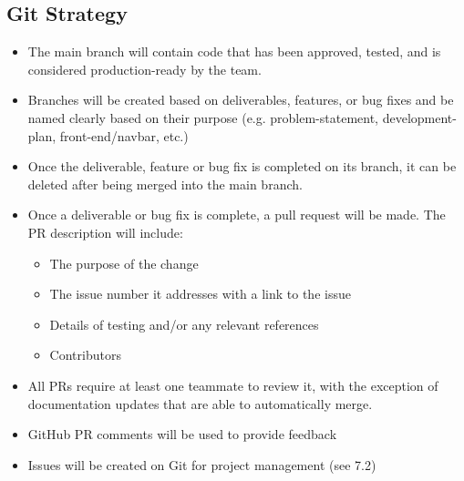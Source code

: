 \documentclass{article}
\begin{document}
\subsection{Git Strategy}
\begin{itemize}
	\item The main branch will contain code that has been approved, tested, and is considered production-ready by 
  the team.
	\item Branches will be created based on deliverables, features, or bug fixes and be named clearly based on their 
  purpose (e.g. problem-statement, development-plan, front-end/navbar, etc.) 
  \item Once the deliverable, feature or bug fix is completed on its branch, it can be deleted after being merged into the main branch.
	\item Once a deliverable or bug fix is complete, a pull request will be made. The PR description will include:
	\begin{itemize}
    \item The purpose of the change
    \item The issue number it addresses with a link to the issue
    \item Details of testing and/or any relevant references
    \item Contributors
  \end{itemize}
	\item All PRs require at least one teammate to review it, with the exception of documentation updates that are 
  able to automatically merge.
	\item GitHub PR comments will be used to provide feedback
	\item Issues will be created on Git for project management (see 7.2)
\end{itemize}
\end{document}
